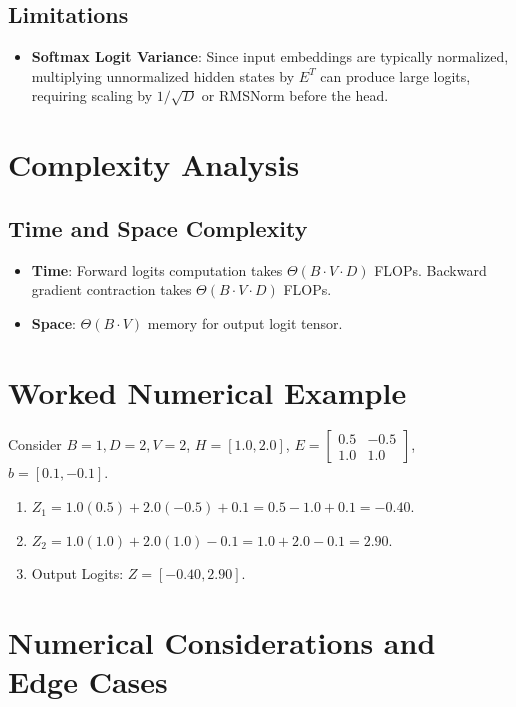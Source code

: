 \documentclass[11pt,a4paper]{article}
\theoremstyle{definition}
\begin{document}
\subsection{Limitations}
\begin{itemize}
    \item \textbf{Softmax Logit Variance}: Since input embeddings are typically normalized, multiplying unnormalized hidden states by $E^T$ can produce large logits, requiring scaling by $1/\sqrt{D}$ or RMSNorm before the head.
\end{itemize}

\section{Complexity Analysis}

\subsection{Time and Space Complexity}
\begin{itemize}
    \item \textbf{Time}: Forward logits computation takes $\Theta(B \cdot V \cdot D)$ FLOPs. Backward gradient contraction takes $\Theta(B \cdot V \cdot D)$ FLOPs.
    \item \textbf{Space}: $\Theta(B \cdot V)$ memory for output logit tensor.
\end{itemize}

\section{Worked Numerical Example}

Consider $B=1, D=2, V=2$, $H = [1.0, 2.0]$, $E = \begin{bmatrix} 0.5 & -0.5 \\ 1.0 & 1.0 \end{bmatrix}$, $b = [0.1, -0.1]$.

\begin{enumerate}
    \item $Z_1 = 1.0(0.5) + 2.0(-0.5) + 0.1 = 0.5 - 1.0 + 0.1 = -0.40$.
    \item $Z_2 = 1.0(1.0) + 2.0(1.0) - 0.1 = 1.0 + 2.0 - 0.1 = 2.90$.
    \item Output Logits: $Z = [-0.40, 2.90]$.
\end{enumerate}

\section{Numerical Considerations and Edge Cases}
\end{document}
